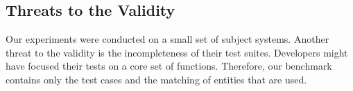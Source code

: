 \subsection{Threats to the Validity}

Our experiments were conducted on a small set of subject
systems. Another threat to the validity is the incompleteness of their
test suites. Developers might have focused their tests on a core set
of functions. Therefore, our benchmark contains only the test cases
and the matching of entities that are used.



